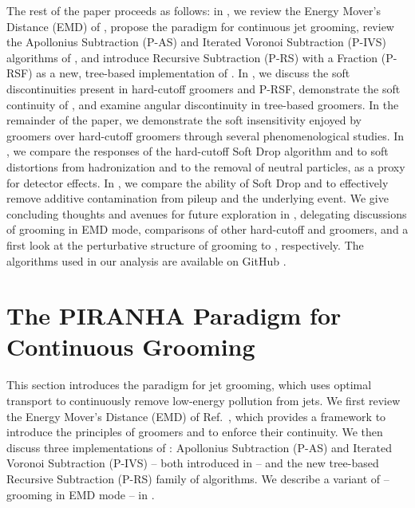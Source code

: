 \documentclass[letterpaper,11pt]{article}
\begin{document}
The rest of the paper proceeds as follows:
%
in , we review the Energy Mover's Distance (EMD) of , propose the \PIRANHA{} paradigm for continuous jet grooming, review the Apollonius Subtraction (P-AS) and Iterated Voronoi Subtraction (P-IVS) algorithms of , and introduce Recursive Subtraction (P-RS) with a Fraction (P-RSF) as a new, tree-based implementation of \PIRANHA{}.
%
In , we discuss the soft discontinuities present in hard-cutoff groomers and P-RSF, demonstrate the soft continuity of , and examine angular discontinuity in tree-based groomers.
%
In the remainder of the paper, we demonstrate the soft insensitivity enjoyed by \PIRANHA{} groomers over hard-cutoff groomers through several phenomenological studies.
%
In , we compare the responses of the hard-cutoff Soft Drop algorithm and  to soft distortions from hadronization and to the removal of neutral particles, as a proxy for detector effects.
%
In , we compare the ability of Soft Drop and  to effectively remove additive contamination from pileup and the underlying event.
%
We give concluding thoughts and avenues for future exploration in , delegating discussions of \PIRANHA{} grooming in EMD mode, comparisons of other hard-cutoff and \PIRANHA{} groomers, and a first look at the perturbative structure of \PIRANHA{} grooming to , respectively.
%
The \PIRANHA{} algorithms used in our analysis are available on GitHub \cite{piranhagithub}.


\section{The PIRANHA{} Paradigm for Continuous Grooming}
\label{sec:PIRANHA}

This section introduces the \PIRANHA{} paradigm for jet grooming, which uses optimal transport to continuously remove low-energy pollution from jets.
%
We first review the Energy Mover's Distance (EMD) of Ref.~\cite{Komiske:2019fks}, which provides a framework to introduce the principles of \PIRANHA{} groomers and to enforce their continuity.
%
We then discuss three implementations of \PIRANHA{}:
%
Apollonius Subtraction (P-AS) and Iterated Voronoi Subtraction (P-IVS) -- both introduced in  -- and the new tree-based Recursive Subtraction (P-RS) family of \PIRANHA{} algorithms.
%
We describe a variant of \PIRANHA{} -- grooming in EMD mode -- in .
\end{document}
